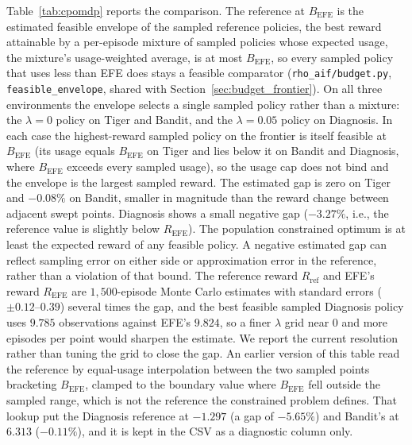 Table~\ref{tab:cpomdp} reports the comparison. The reference at $B_{\mathrm{EFE}}$ is the estimated feasible envelope of the sampled reference policies, the best reward attainable by a per-episode mixture of sampled policies whose expected usage, the mixture's usage-weighted average, is at most $B_{\mathrm{EFE}}$, so every sampled policy that uses less than EFE does stays a feasible comparator (\texttt{rho\_\allowbreak aif/\allowbreak budget.py}, \texttt{feasible\_\allowbreak envelope}, shared with Section~\ref{sec:budget_frontier}). On all three environments the envelope selects a single sampled policy rather than a mixture: the $\lambda{=}0$ policy on Tiger and Bandit, and the $\lambda{=}0.05$ policy on Diagnosis. In each case the highest-reward sampled policy on the frontier is itself feasible at $B_{\mathrm{EFE}}$ (its usage equals $B_{\mathrm{EFE}}$ on Tiger and lies below it on Bandit and Diagnosis, where $B_{\mathrm{EFE}}$ exceeds every sampled usage), so the usage cap does not bind and the envelope is the largest sampled reward. The estimated gap is zero on Tiger and $-0.08\%$ on Bandit, smaller in magnitude than the reward change between adjacent swept points. Diagnosis shows a small negative gap ($-3.27\%$, i.e., the reference value is slightly below $R_{\mathrm{EFE}}$). The population constrained optimum is at least the expected reward of any feasible policy. A negative estimated gap can reflect sampling error on either side or approximation error in the reference, rather than a violation of that bound. The reference reward $R_{\mathrm{ref}}$ and EFE's reward $R_{\mathrm{EFE}}$ are $1{,}500$-episode Monte Carlo estimates with standard errors ($\pm 0.12$--$0.39$) several times the gap, and the best feasible sampled Diagnosis policy uses $9.785$ observations against EFE's $9.824$, so a finer $\lambda$ grid near $0$ and more episodes per point would sharpen the estimate. We report the current resolution rather than tuning the grid to close the gap. An earlier version of this table read the reference by equal-usage interpolation between the two sampled points bracketing $B_{\mathrm{EFE}}$, clamped to the boundary value where $B_{\mathrm{EFE}}$ fell outside the sampled range, which is not the reference the constrained problem defines. That lookup put the Diagnosis reference at $-1.297$ (a gap of $-5.65\%$) and Bandit's at $6.313$ ($-0.11\%$), and it is kept in the CSV as a diagnostic column only.

